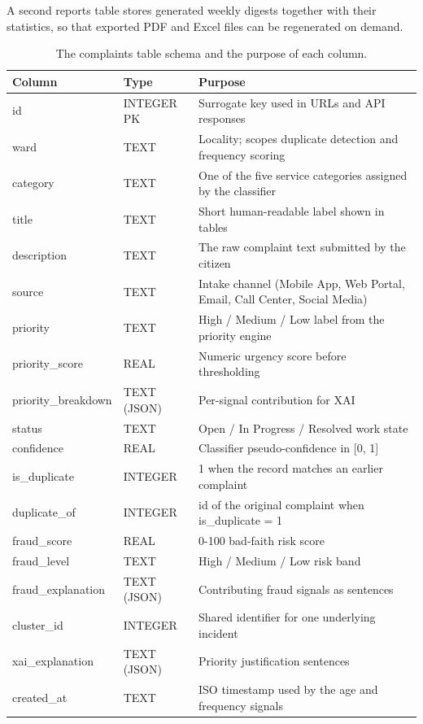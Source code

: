 \documentclass[10pt,letterpaper,oneside]{article}\usepackage{geometry}\geometry{top=1in,bottom=1in,left=1in,right=1in,includeheadfoot}\usepackage{xcolor}\definecolor{color@navy}{HTML}{1F3B63}\definecolor{color@grey}{HTML}{404040}\definecolor{color@hdr}{HTML}{F2F4F7}\usepackage{titlesec}\titleformat{\section}  {\normalfont\huge\bfseries\color@navy}  {}{0pt}{\MakeUppercase}\titleformat{\subsection}  {\normalfont\Large\bfseries\color@navy}  {}{0pt}{}\titleformat{\subsubsection}  {\normalfont\large\bfseries\color@navy}  {}{0pt}{}\titlespacing*{\section}{0pt}{14pt}{6pt}\titlespacing*{\subsection}{0pt}{10pt}{4pt}\titlespacing*{\subsubsection}{0pt}{8pt}{3pt}\setlength{\parindent}{0pt}\setlength{\parskip}{0.6em}\parindent=0pt\usepackage{enumitem}\setlist{nosep,leftmargin=*,itemsep=0pt,topsep=2pt,partopsep=0pt}\usepackage{array}\usepackage{booktabs}\usepackage{caption}\captionsetup{font={small,it},labelfont={bf},labelsep=period,  parskip=2pt,skip=4pt,list=no}\captionsetup[table]{labelfont={bf,small,color@navy},name=Table}\usepackage{graphicx}\usepackage{verbatim}\usepackage{ragged2e}\usepackage{longtable}\usepackage{tabularx}\usepackage{multirow}\usepackage{colortbl}\definecolor{rowshade}{HTML}{F2F4F7}\usepackage{tikz}\usetikzlibrary{positioning,calc}\usepackage[hidelinks]{hyperref}\hypersetup{colorlinks=true,linkcolor=color@navy,urlcolor=color@navy}\pagestyle{fancy}\fancyhf{}\renewcommand{\headrulewidth}{0.4pt}\fancyhead[L]{\small\color@navy CivicSense — Project Report}\fancyhead[R]{\small\color@grey October 11, 2026}\fancyfoot[C]{\small\color@grey An Integrated Intelligent Triage Pipelin}\fancyfoot[R]{\small\color@grey Page \thepage}\usepackage{setspace}\setstretch{1.15}\AtBeginDocument{  \hypersetup{pdftitle={An Integrated Intelligent Triage Pipeline for AI-Enhanced Citizen Complaint Management},    pdfauthor={CivicSense Project Team},    pdfsubject={Project Report},    pdfkeywords={smart cities, NLP, complaint management, e-governance},    pdfcreator={CivicSense Project Team}  }}
\begin{document}
A second reports table stores generated weekly digests together with their statistics, so that exported PDF and Excel files can be regenerated on demand.

\begin{table}[htbp]
\centering
\small
\begin{tabular}{@{}lll@{}}
\toprule
Column & Type & Purpose \\
\midrule
id & INTEGER PK & Surrogate key used in URLs and API responses \\
ward & TEXT & Locality; scopes duplicate detection and frequency scoring \\
category & TEXT & One of the five service categories assigned by the classifier \\
title & TEXT & Short human-readable label shown in tables \\
description & TEXT & The raw complaint text submitted by the citizen \\
source & TEXT & Intake channel (Mobile App, Web Portal, Email, Call Center, Social Media) \\
priority & TEXT & High / Medium / Low label from the priority engine \\
priority\_score & REAL & Numeric urgency score before thresholding \\
priority\_breakdown & TEXT (JSON) & Per-signal contribution for XAI \\
status & TEXT & Open / In Progress / Resolved work state \\
confidence & REAL & Classifier pseudo-confidence in [0, 1] \\
is\_duplicate & INTEGER & 1 when the record matches an earlier complaint \\
duplicate\_of & INTEGER & id of the original complaint when is\_duplicate = 1 \\
fraud\_score & REAL & 0-100 bad-faith risk score \\
fraud\_level & TEXT & High / Medium / Low risk band \\
fraud\_explanation & TEXT (JSON) & Contributing fraud signals as sentences \\
cluster\_id & INTEGER & Shared identifier for one underlying incident \\
xai\_explanation & TEXT (JSON) & Priority justification sentences \\
created\_at & TEXT & ISO timestamp used by the age and frequency signals \\
\bottomrule
\end{tabular}
\caption{The complaints table schema and the purpose of each column.}
\end{table}
\end{document}
